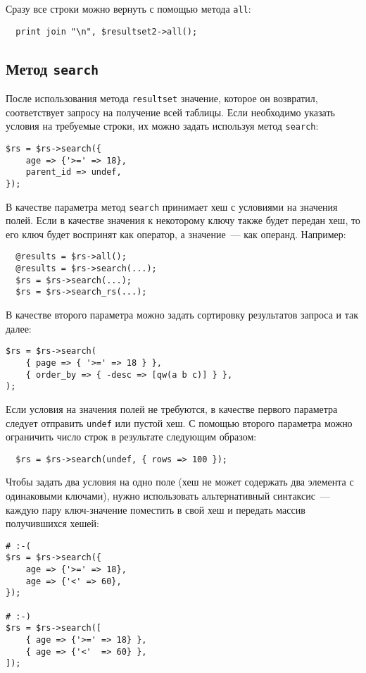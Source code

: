 Сразу все строки можно вернуть с помощью метода \verb|all|:
\begin{verbatim}
  print join "\n", $resultset2->all();
\end{verbatim}

\subsection{Метод \texttt{search}}
После использования метода \texttt{resultset} значение, которое он возвратил, соответствует запросу на получение всей таблицы. Если необходимо указать условия на требуемые строки, их можно задать используя метод \texttt{search}:
\begin{verbatim}
$rs = $rs->search({
    age => {'>=' => 18},
    parent_id => undef,
});
\end{verbatim}
В качестве параметра метод \texttt{search} принимает хеш с условиями на значения полей. Если в качестве значения к некоторому ключу также будет передан хеш, то его ключ будет воспринят как оператор, а значение~--- как операнд. Например:
\begin{verbatim}
  @results = $rs->all();
  @results = $rs->search(...);
  $rs = $rs->search(...);
  $rs = $rs->search_rs(...);
\end{verbatim}
В качестве второго параметра можно задать сортировку результатов запроса и так далее:
\begin{verbatim}
$rs = $rs->search(
    { page => { '>=' => 18 } },
    { order_by => { -desc => [qw(a b c)] } },
);
\end{verbatim}
Если условия на значения полей не требуются, в качестве первого параметра следует отправить \verb|undef| или пустой хеш. С помощью второго параметра можно ограничить число строк в результате следующим образом:
\begin{verbatim}
  $rs = $rs->search(undef, { rows => 100 });
\end{verbatim}
Чтобы задать два условия на одно поле (хеш не может содержать два элемента с одинаковыми ключами), нужно использовать альтернативный синтаксис~--- каждую пару ключ-значение поместить в свой хеш и передать массив получившихся хешей:
\begin{verbatim}
# :-(
$rs = $rs->search({
    age => {'>=' => 18},
    age => {'<' => 60},
});

# :-)
$rs = $rs->search([
    { age => {'>=' => 18} },
    { age => {'<'  => 60} },
]);
\end{verbatim}

